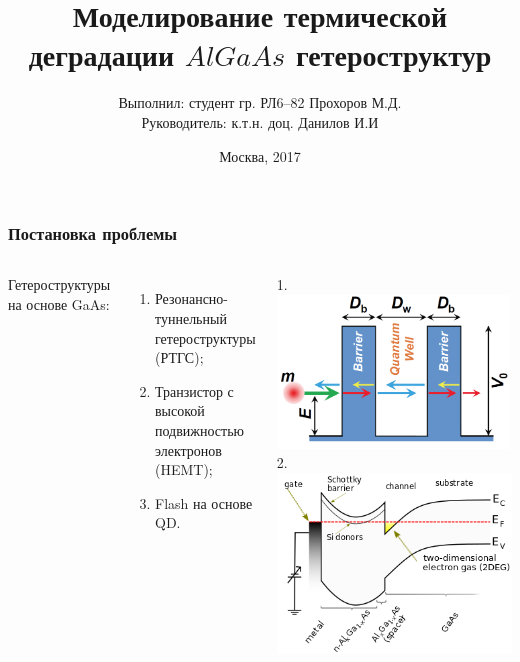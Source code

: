 \documentclass[10pt,pdf,hyperref={unicode},aspectratio={169}]{beamer}
\title{Моделирование термической деградации $AlGaAs$ гетероструктур}
\author[Прохоров М.Д.]{Выполнил: студент гр. РЛ6--82 Прохоров М.Д.\\ Руководитель: к.т.н. доц. Данилов И.И}
\date{Москва, 2017}
\institute[BMSTU]{МГТУ им. Н.Э.Баумана}
\begin{document}
\begin{frame}[plain]
	\titlepage
\end{frame} 


\begin{frame}
	\frametitle{Постановка проблемы}
	\begin{columns}
	\small
	Гетероструктуры на основе GaAs:
	\scriptsize
	\begin{enumerate}
		\item Резонансно-туннельный гетероструктуры (РТГС);
		\item Транзистор с высокой подвижностью электронов (HEMT);
		\item Flash на основе QD.
	\end{enumerate}
	\begin{columns}
		{\large\color{red}1.}
		\includegraphics[width=0.99\textwidth]{assets/RTDItro}
		{\large\color{red}2.}
		\includegraphics[width=.99\textwidth]{assets/HEMT}
	\end{columns}


\end{columns}
\end{frame}
\end{document}
